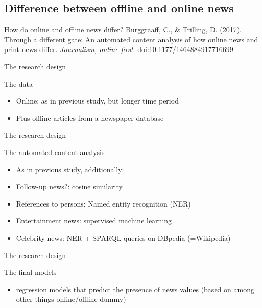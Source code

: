 \documentclass{beamer}
\begin{document}
\subsection{Difference between offline and online news}
\begin{frame}{How do online and offline news differ?}
Burggraaff, C., \& Trilling, D. (2017). Through a different gate: An automated content analysis of how online news and print news differ. \textit{Journalism, online first}. doi:10.1177/1464884917716699
\end{frame}


\begin{frame}{The research design}
	\begin{block}{The data}
		\begin{itemize}
		\item Online: as in previous study, but longer time period
		\item Plus offline articles from a newspaper database
		\end{itemize}
	\end{block}
\end{frame}


\begin{frame}{The research design}
	\begin{block}{The automated content analysis}
	\begin{itemize}
	\item As in previous study, additionally:
	\item Follow-up news?: cosine similarity
	\item References to persons: Named entity recognition (NER)
	\item Entertainment news: supervised machine learning
	\item Celebrity news: NER + SPARQL-queries on DBpedia (=Wikipedia)
	\end{itemize}
	\end{block}
\end{frame}



\begin{frame}{The research design}
	\begin{block}{The final models}
		\begin{itemize}
			\item regression models that predict the presence of news values (based on among other things online/offline-dummy)
		\end{itemize}
	\end{block}
\end{frame}
\end{document}
